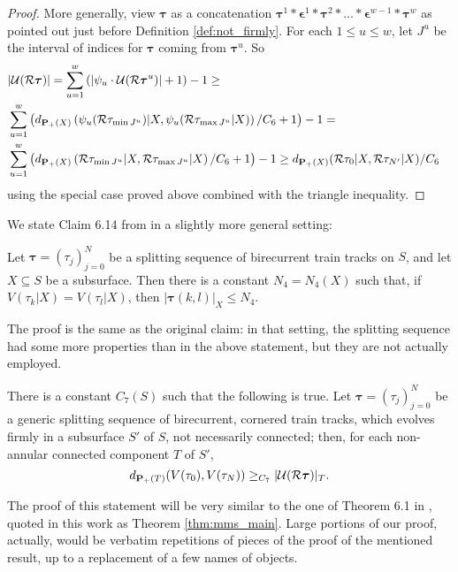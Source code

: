 \begin{proof}
More generally, view $\bm\tau$ as a concatenation $\bm\tau^1*\bm\epsilon^1*\bm\tau^2*\ldots*\bm\epsilon^{w-1}*\bm\tau^w$ as pointed out just before Definition \ref{def:not_firmly}. For each $1\leq u\leq w$, let $J^u$ be the interval of indices for $\bm\tau$ coming from $\bm\tau^u$. So
\begin{eqnarray*}
 & |{\mathcal U}({\mathcal R}\bm\tau)|= \sum_{u=1}^w \left(|\psi_u\cdot{\mathcal U}({\mathcal R}\bm\tau^u)|+1\right)-1 \geq & \\
 & \sum_{u=1}^w \left(d_{{\mathbf{P}_+}(X)}\left(\psi_u({\mathcal R}\tau_{\min J^u})|X, \psi_u({\mathcal R}\tau_{\max J^u}|X)\right)/C_6+1\right) -1 = & \\
 & \sum_{u=1}^w \left(d_{{\mathbf{P}_+}(X)}\left({\mathcal R}\tau_{\min J^u}|X, {\mathcal R}\tau_{\max J^u}|X\right)/C_6+1\right) -1\geq d_{{\mathbf{P}_+}(X)}({\mathcal R}\tau_0|X,{\mathcal R}\tau_{N'}|X)/C_6 &
\end{eqnarray*} 
using the special case proved above combined with the triangle inequality.
\end{proof}

We state Claim 6.14 from \cite{mms} in a slightly more general setting:
\begin{lemma}\label{lem:mms614}
Let $\bm\tau=(\tau_j)_{j=0}^N$ be a splitting sequence of birecurrent train tracks on $S$, and let $X\subseteq S$ be a subsurface. Then there is a constant $N_4=N_4(X)$ such that, if $V(\tau_k|X)=V(\tau_l|X)$, then $|\bm\tau(k,l)|_X\leq N_4$.
\end{lemma}

The proof is the same as the original claim: in that setting, the splitting sequence had some more properties than in the above statement, but they are not actually employed.

\begin{prop}\label{prp:hardttbound}
There is a constant $C_7(S)$ such that the following is true. Let $\bm\tau=(\tau_j)_{j=0}^N$ be a generic splitting sequence of birecurrent, cornered train tracks, which evolves firmly in a subsurface $S'$ of $S$, not necessarily connected; then, for each non-annular connected component $T$ of $S'$,
$$d_{{\mathbf{P}_+}(T)}(V(\tau_0),V(\tau_N))\geq_{C_7}|{\mathcal U}({\mathcal R}\bm\tau)|_T.$$
\end{prop}

The proof of this statement will be very similar to the one of Theorem 6.1 in \cite{mms}, quoted in this work as Theorem \ref{thm:mms_main}. Large portions of our proof, actually, would be verbatim repetitions of pieces of the proof of the mentioned result, up to a replacement of a few names of objects.

